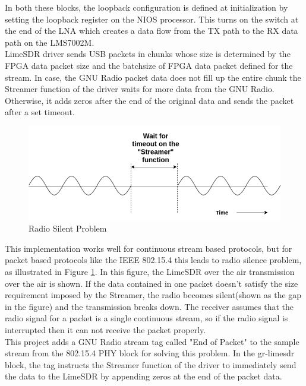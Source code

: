 In both these blocks, the loopback configuration is defined at initialization by setting the loopback register on the NIOS processor.
This turns on the switch at the end of the \ac{LNA} which creates a data flow from the TX path to the RX data path on the LMS7002M.\\


LimeSDR driver sends USB packets in chunks whose size is determined by the FPGA data packet size and the batchsize of FPGA data packet defined for the stream.
In case, the GNU Radio packet data does not fill up the entire chunk the Streamer function of the driver waits for more data from the GNU Radio.
Otherwise, it adds zeros after the end of the original data and sends the packet after a set timeout.\\

\begin{figure}[h!]
\centering
\includegraphics[scale=0.6]{Thesis/Figure/SilentProblem.png}
\caption{Radio Silent Problem}
\label{Radio_Silent}
\end{figure}

This implementation works well for continuous stream based protocols, but for packet based protocols like the IEEE 802.15.4 this leads to radio silence problem, as illustrated in Figure \ref{Radio_Silent}.
In this figure, the LimeSDR over the air transmission over the air is shown.
If the data contained in one packet doesn't satisfy the size requirement imposed by the Streamer, the radio becomes silent(shown as the gap in the figure) and the transmission breaks down.
The receiver assumes that the radio signal for a packet is a single continuous stream, so if the radio signal is interrupted then it can not receive the packet properly.\\

This project adds a GNU Radio stream tag called "End of Packet" to the sample stream from the 802.15.4 PHY block for solving this problem.
In the gr-limesdr block, the tag instructs the Streamer function of the driver to immediately send the data to the LimeSDR by appending zeros at the end of the packet data.


